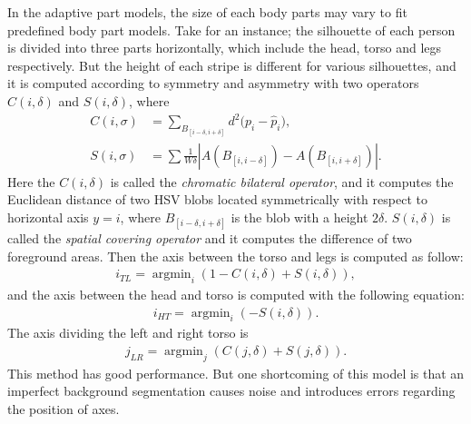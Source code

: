 In the adaptive part models, the size of each body parts may vary to fit predefined body part models. Take \cite{SDALF} for an instance; the silhouette of each person is divided into three parts horizontally, which include the head, torso and legs respectively. But the height of each stripe is different for various silhouettes, and it is computed according to symmetry and asymmetry with two operators $C(i, \delta)$ and $S(i,\delta)$, where 
\begin{equation}
\begin{aligned}
C(i,\sigma) & = \sum_{B_{[i-\delta, i+\delta]}}{d^2(p_i-{\hat{p}_i)}}, \\
S(i,\sigma) &= \sum{\frac{1}{W\delta}|A(B_{[i,i-\delta]}) - A(B_{[i,i+\delta]})|}.
\end{aligned}
\end{equation}
Here the $C(i, \delta)$ is called the \emph{chromatic bilateral operator}, and it computes the Euclidean distance of two HSV blobs located symmetrically with respect to horizontal axis $y = i$, where $B_{[i-\delta, i+\delta]}$ is the blob with a height $2\delta$. $S(i,\delta)$ is called the \emph{spatial covering operator} and it computes the difference of two foreground areas. Then the axis between the torso and legs is computed as follow:
\begin{equation}
\begin{aligned}
i_{TL} = \mathop{\arg\min}_i(1-C(i,\delta)+S(i,\delta)),
\end{aligned}
\end{equation}
and the axis  between the head and torso is computed with the following equation:
\begin{equation}
\begin{aligned}
i_{HT} = \mathop{\arg\min}_i(-S(i,\delta)).
\end{aligned}
\end{equation}
The axis dividing the left and right torso is
\begin{equation}
\begin{aligned}
j_{LR} = \mathop{\arg\min}_j(C(j,\delta)+S(j,\delta)).
\end{aligned}
\end{equation}
This method has good performance. But one shortcoming of this model is that an imperfect background segmentation causes noise and introduces errors regarding the position of axes. \\
